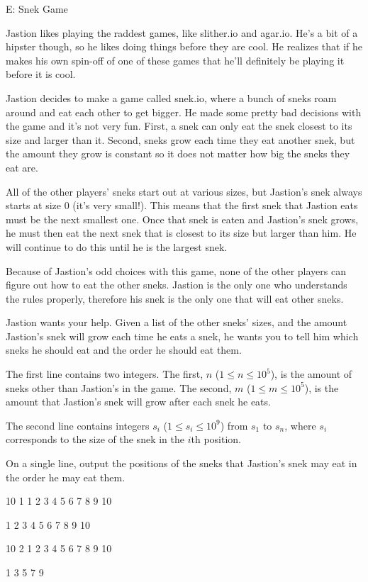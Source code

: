 \begin{problem}{E: Snek Game}

Jastion likes playing the raddest games, like slither.io and agar.io.
He's a bit of a hipster though, so he likes doing things before they are cool.
He realizes that if he makes his own spin-off of one of these games that he'll definitely be playing it before it is cool.

Jastion decides to make a game called snek.io, where a bunch of sneks roam around and eat each other to get bigger.
He made some pretty bad decisions with the game and it's not very fun.
First, a snek can only eat the snek closest to its size and larger than it.
Second, sneks grow each time they eat another snek, but the amount they grow is constant so it does not matter how big the sneks they eat are.

All of the other players' sneks start out at various sizes, but Jastion's snek always starts at size $0$ (it's very small!).
This means that the first snek that Jastion eats must be the next smallest one.
Once that snek is eaten and Jastion's snek grows, he must then eat the next snek that is closest to its size but larger than him.
He will continue to do this until he is the largest snek.

Because of Jastion's odd choices with this game, none of the other players can figure out how to eat the other sneks.
Jastion is the only one who understands the rules properly, therefore his snek is the only one that will eat other sneks.

Jastion wants your help.
Given a list of the other sneks' sizes, and the amount Jastion's snek will grow each time he eats a snek, he wants you to tell him which sneks he should eat and the order he should eat them.
\end{problem}

\begin{formalin}
The first line contains two integers. The first, $n$ ($1 \leq n \leq 10^5$), is the amount of sneks other than Jastion's in the game.
The second, $m$ ($1 \leq m \leq 10^5$), is the amount that Jastion's snek will grow after each snek he eats.

The second line contains integers $s_i$ ($1 \leq s_i \leq 10^9$) from $s_1$ to $s_n$, where $s_i$ corresponds to the size of the snek in the $i$th position.
\end{formalin}

\begin{formalout}
On a single line, output the positions of the sneks that Jastion's snek may eat in the order he may eat them.
\end{formalout}

\begin{datain}
10 1
1 2 3 4 5 6 7 8 9 10
\end{datain}
\begin{dataout}
1 2 3 4 5 6 7 8 9 10
\end{dataout}

\begin{datain}
10 2
1 2 3 4 5 6 7 8 9 10
\end{datain}
\begin{dataout}
1 3 5 7 9
\end{dataout}